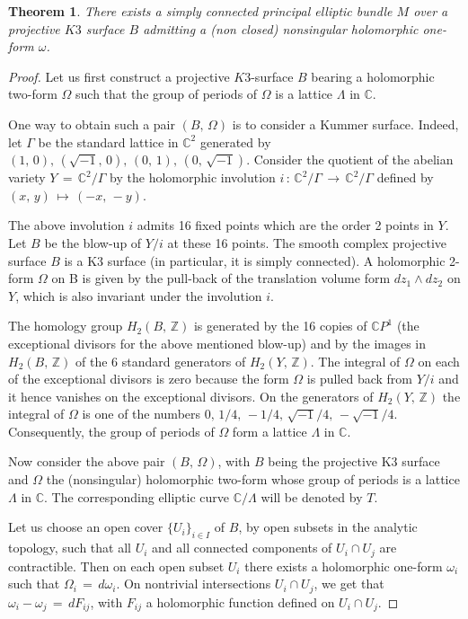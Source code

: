 \documentclass[12pt,reqno]{amsart}
\newtheorem{theorem}{Theorem}[section]
\theoremstyle{definition}
\numberwithin{equation}{section}
\begin{document}
\begin{theorem}\label{simply connected with forms}
There exists a simply connected principal elliptic bundle $M$ over a projective $K3$ surface $B$ admitting 
a (non closed) nonsingular holomorphic one-form $\omega$.
\end{theorem} 

\begin{proof}
Let us first construct a projective $K3$-surface $B$ bearing a holomorphic two-form $\Omega$ such that the
group of periods of $\Omega$ is a lattice $\Lambda$ in $\mathbb C$.

One way to obtain such a pair $(B, \,\Omega)$ is to consider a Kummer surface. Indeed, let $\Gamma$ be the 
standard lattice in $\mathbb{C}^2$ generated by $(1,\,0),\, (\sqrt{-1},\,0),\, (0,\,1),\, (0,\,\sqrt{-1})$. 
Consider the quotient of the abelian variety $Y\,=\,\mathbb {C}^2 / \Gamma$ by the holomorphic involution 
$i\,:\, \mathbb {C}^2 / \Gamma\, \longrightarrow\, \mathbb {C}^2 / \Gamma$ defined by $(x, \,y) 
\,\longmapsto\, (-x,\, -y)$.

The above involution $i$ admits 16 fixed points which are the order 2 points in $Y$. Let $B$ be the 
blow-up of $Y/i $ at these 16 points. The smooth complex projective surface $B$ is a K3 surface (in 
particular, it is simply connected). A holomorphic 2-form $\Omega$ on B is given by the 
pull-back of the translation volume form $dz_1\wedge dz_2$ on $Y$, which is also invariant under the 
involution $i$.

The homology group $H_2(B,\, \mathbb{Z})$ is generated by the 16 copies of ${\mathbb C}P^1$ (the 
exceptional divisors for the above mentioned blow-up) and by the images in $H_2(B,\, \mathbb{Z})$ of the 6 
standard generators of $H_2(Y, \,\mathbb{Z}).$ The integral of $\Omega$ on each of the exceptional divisors is zero 
because the form $\Omega$ is pulled back from $Y/i$ and it hence vanishes on the exceptional divisors. On the 
generators of $H_2(Y,\, \mathbb{Z})$ the integral of $\Omega$ is one of the numbers $0,\, 1/4,\, -1/4,\, 
\sqrt{-1}/4,\, -\sqrt{-1}/4.$ Consequently, the group of periods of $\Omega$ form a lattice $\Lambda$ in 
$\mathbb C$.

Now consider the above pair $(B,\, \Omega)$, with $B$ being the projective K3 surface and $\Omega$ the 
(nonsingular) holomorphic two-form whose group of periods is a lattice $\Lambda$ in $\mathbb C$. The 
corresponding elliptic curve $\mathbb{C}/\Lambda$ will be denoted by $T$.

Let us choose an open cover $\{U_i\}_{i \in I}$ of $B$, by open subsets in the analytic topology, such that 
all $U_i$ and all connected components of $U_i \cap U_j$ are contractible. Then on each open subset $U_i$ 
there exists a holomorphic one-form $\omega_i$ such that $\Omega_i\,=\,d \omega_i$. On nontrivial 
intersections $U_i \cap U_j$, we get that $\omega_i-\omega_j\,=\,dF_{ij}$, with $F_{ij}$ a holomorphic 
function defined on $U_i \cap U_j$.


\end{proof}
\end{document}

